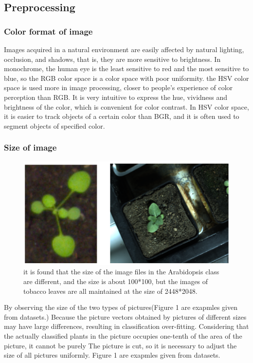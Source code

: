 \documentclass[conference]{IEEEtran}
\begin{document}
\subsection{Preprocessing}
\subsubsection{Color format of image}
 
 Images acquired in a natural environment are easily affected by natural lighting, occlusion, and shadows, that is, they are more sensitive to brightness. In monochrome, the human eye is the least sensitive to red and the most sensitive to blue, so the RGB color space is a color space with poor uniformity. 
the HSV color space is used more in image processing, closer to people's experience of color perception than RGB. It is very intuitive to express the hue, vividness and brightness of the color, which is convenient for color contrast. In HSV color space, it is easier to track objects of a certain color than BGR, and it is often used to segment objects of specified color.

\subsubsection{Size of image}
\begin{figure}[htbp]
\centerline{\includegraphics[scale=0.4]{p2.png}}
\caption{it is found that the size of the image files in the Arabidopsis class are different, and the size is about 100*100, but the images of tobacco leaves are all maintained at the size of 2448*2048.}
\label{fig2}
\end{figure}

By observing the size of the two types of pictures(Figure 1  are exapmles given from datasets.) 
Because the picture vectors obtained by pictures of different sizes may have large differences, resulting in classification over-fitting. Considering that the actually classified plants in the picture occupies one-tenth of the area of the picture, it cannot be purely The picture is cut, so it is necessary to adjust the size of all pictures uniformly. 
Figure 1  are exapmles given from datasets.
\end{document}

